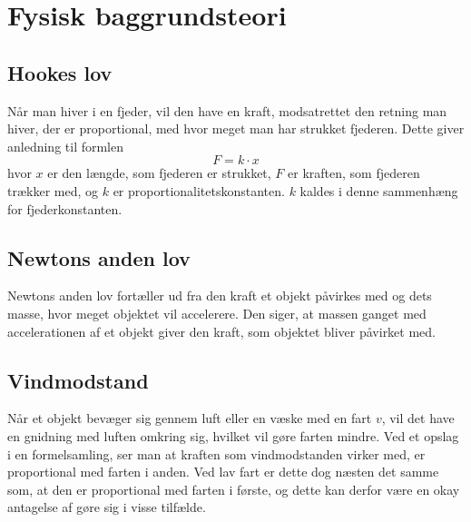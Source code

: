 \section{Fysisk baggrundsteori}
\subsection{Hookes lov}\label{teori:Hooks lov}
Når man hiver i en fjeder, vil den have en kraft, modsatrettet den retning man hiver, der er proportional, med hvor meget man har strukket fjederen. 
Dette giver anledning til formlen 
$$F =k\cdot x$$
hvor $x$ er den længde, som fjederen er strukket, $F$ er kraften, som fjederen trækker med, og $k$ er proportionalitetskonstanten. 
$k$ kaldes i denne sammenhæng for fjederkonstanten.

\subsection{Newtons anden lov}\label{teori:Newtons anden lov}
Newtons anden lov fortæller ud fra den kraft et objekt påvirkes med og dets masse, hvor meget objektet vil accelerere. 
Den siger, at massen ganget med accelerationen af et objekt giver den kraft, som objektet bliver påvirket med.

\subsection{Vindmodstand}\label{teori:vindmodstand}
Når et objekt bevæger sig gennem luft eller en væske med en fart $v$, vil det have en gnidning med luften omkring sig, hvilket vil gøre farten mindre.
Ved et opslag i en formelsamling, ser man at kraften som vindmodstanden virker med, er proportional med farten i anden. 
Ved lav fart er dette dog næsten det samme som, at den er proportional med farten i første, og dette kan derfor være en okay antagelse af gøre sig i visse tilfælde.
